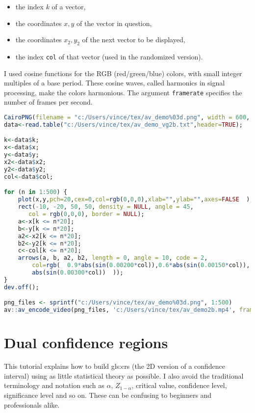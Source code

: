 \documentclass[oneside,10pt]{book}
\begin{document}
\begin{itemize}
\item the index $k$ of a vector,
\item the coordinates $x, y$ of the vector in question,
\item the coordinates $x_2, y_2$ of the next vector to be displayed,
\item the index \texttt{col} of that vector (used in the randomized version).
\end{itemize}
\noindent I used cosine functions for the RGB (red/green/blue) colors, with small integer multiples of a base period. These cosine waves, called harmonics in signal processing, make the colors harmonious. The argument \texttt{framerate} specifies the number of frames per second. \\

\begin{lstlisting}[language=R]
CairoPNG(filename = "c:/Users/vince/tex/av_demo%03d.png", width = 600, height = 600);
data<-read.table("c:/Users/vince/tex/av_demo_vg2b.txt",header=TRUE);

k<-data$k;
x<-data$x;
y<-data$y;
x2<-data$x2;
y2<-data$y2;
col<-data$col;

for (n in 1:500) {
    plot(x,y,pch=20,cex=0,col=rgb(0,0,0),xlab="",ylab="",axes=FALSE  );
    rect(-10, -20, 50, 50, density = NULL, angle = 45,
       col = rgb(0,0,0), border = NULL);
    a<-x[k <= n*20];
    b<-y[k <= n*20];
    a2<-x2[k <= n*20];
    b2<-y2[k <= n*20];
    c<-col[k <= n*20];
    arrows(a, b, a2, b2, length = 0, angle = 10, code = 2,
        col=rgb(  0.9*abs(sin(0.00200*col)),0.6*abs(sin(0.00150*col)),
        abs(sin(0.00300*col))  ));
}
dev.off();

png_files <- sprintf("c:/Users/vince/tex/av_demo%03d.png", 1:500)
av::av_encode_video(png_files, 'c:/Users/vince/tex/av_demo2b.mp4', framerate = 12)
\end{lstlisting}








\section{Dual confidence regions}\label{dualcr1wqa}

This tutorial explains how to build \glspl{gls:cr} (the 2D version of a confidence interval) using as little statistical theory as possible. I also avoid the traditional terminology and notation such as $\alpha$, $Z_{1-\alpha}$, critical value, confidence level, significance level and so on. These can be confusing to beginners and professionals alike.
\end{document}
